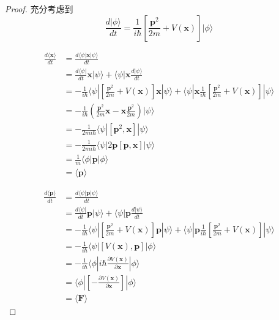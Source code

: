 \documentclass{article}
\newtheorem{proof}{Proof}[section]
\numberwithin{equation}{section}
\newcommand{\bra}[1]{\langle #1 |}
\newcommand{\ket}[1]{| #1 \rangle}
\newcommand{\bracketl}[3]{\langle #1 | #2 | #3 \rangle}
\newcommand{\mean}[1]{\langle #1 \rangle}
\begin{document}
  \begin{proof}
    充分考虑到
    \begin{equation}
    \frac{d\ket{\phi}}{dt}=\frac{1}{i\hbar}[\frac{\textbf{p}^2}{2m}+V(\textbf{x})]\ket{\phi}
    \end{equation}

    \begin{align*}
    \frac{d \mean{\textbf{x}}}{dt}  & = \frac{d \bracketl{\psi}{\textbf{x}}{\psi}}{dt} \\ 
    & = \frac{d\bra{\psi}}{dt} \textbf{x} \ket{\psi} + \bra{\psi} \textbf{x} \frac{d\ket{\psi}}{dt} \\
    &= - \frac{1}{i \hbar}\bra{\psi}[\frac{\textbf{p}^2}{2m}+V(\textbf{x})]\textbf{x}\ket{\psi}+ \bra{\psi}\textbf{x}\frac{1} {i\hbar}[\frac{\textbf{p}^2}{2m}+V(\textbf{x})]\ket{\psi}\\
    &= -\frac{1}{i\hbar}(\frac{\textbf{p}^2}{2m}\textbf{x}-\textbf{x}\frac{\textbf{p}^2}{2m})\ket{\psi}\\
    &= -\frac{1}{2mi\hbar}\bracketl{\psi}{[\textbf{p}^2,\textbf{x}]}{\psi}\\
    &=-\frac{1}{2mi\hbar}\bracketl{\psi}{2\textbf{p}[\textbf{p},\textbf{x}]}{\psi}\\
    &=\frac{1}{m}\bracketl{\phi}{\textbf{p}}{\phi}\\
    &=\mean{\textbf{p}}
    \end{align*}

    \begin{align*}
    \frac{d\mean{\textbf{p}}}{dt} &= \frac{d\bracketl{\psi}{\textbf{p}}{\psi}}{dt}\\
    &=\frac{d\bra{\psi}}{dt} \textbf{p} \ket{\psi} + \bra{\psi} \textbf{p} \frac{d\ket{\psi}}{dt} \\
    &= - \frac{1}{i \hbar}\bra{\psi}[\frac{\textbf{p}^2}{2m}+V(\textbf{x})]\textbf{p}\ket{\psi}+ \bra{\psi}\textbf{p}\frac{1} {i\hbar}[\frac{\textbf{p}^2}{2m}+V(\textbf{x})]\ket{\psi}\\
    &= -\frac{1}{i\hbar}\bracketl{\psi}{[V(\textbf{x}),\textbf{p}]}{\phi} \\
    & = -\frac{1}{i\hbar}\bracketl{\phi}{i\hbar\frac{\partial V(\textbf{x})}{\partial \textbf{x}}}{\phi}\\
    & = \bracketl{\phi}{[-\frac{\partial V(\textbf{x})}{\partial \textbf{x}}]}{\phi}\\
    & = \mean{\textbf{F}}
    \end{align*}


\end{proof}
\end{document}
